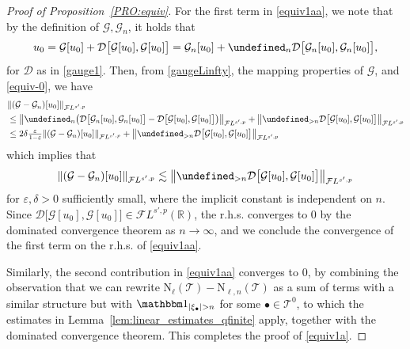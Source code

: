 \documentclass[a4paper,
11pt,  reqno]{amsart}
\newcommand{\5}{\textup{V}}
\newcommand{\FL}{\mathcal{F} L}
\newcommand{\ind}{\mathbbm 1}
\newcommand{\les}{\lesssim}
\newcommand{\dl}{\delta}
\newcommand{\eps}{\varepsilon}
\theoremstyle{remark}
\newcommand{\R}{\mathbb{R}}
\newcommand{\bul}{\bullet}
\let\P= \undefined
\newcommand{\P}{\mathbf{P}}
\newcommand{\TT}{\mathcal{T}}
\renewcommand{\l}{\ell}
\newcommand{\Gc}{\mathcal{G}}
\numberwithin{equation}{section}
\numberwithin{theorem}{section}
\newcommand{\NN}{\mathrm{N}}
\newcommand{\DD}{\mathcal{D}}
\begin{document}
\begin{proof}[Proof of Proposition~\ref{PRO:equiv}]
For the first term in \eqref{equiv1aa}, we note that by the definition of $\Gc, \Gc_n$, it holds that
\begin{align}
u_0
=
\Gc[u_0] + \DD\big[\Gc[u_0], \Gc[u_0]\big]
=
\Gc_n[u_0] + \P_n \DD\big[\Gc_n[u_0], \Gc_n[u_0]\big],
\end{align}
for $\DD$ as in \eqref{gauge1}. Then, from \eqref{gaugeLinfty}, the mapping properties of $\Gc$, and \eqref{equiv-0}, we have
\begin{align}
&
\| (\Gc - \Gc_n)[u_0] \|_{\FL^{s',p}}
\\
&
\le \big\| \P_n \big( \DD\big[\Gc_n[u_0], \Gc_n[u_0]\big]- \DD\big[\Gc[u_0], \Gc[u_0]\big]  \big)  \big\|_{\FL^{s',p}}
+
\big\| \P_{>n} \DD\big[\Gc[u_0], \Gc[u_0]\big]  \big\|_{\FL^{s',p}}
\\
&
\le 2  \dl \tfrac{\eps}{1-\eps} \| (\Gc - \Gc_n)[u_0] \|_{\FL^{s',p}} +
\big\| \P_{>n} \DD\big[\Gc[u_0], \Gc[u_0]\big]  \big\|_{\FL^{s',p}}
\end{align}
which implies that
\begin{align}
\| (\Gc - \Gc_n)[u_0] \|_{\FL^{s',p}}
\les \big\| \P_{>n} \DD\big[\Gc[u_0], \Gc[u_0]\big]  \big\|_{\FL^{s',p}}
\end{align}
for $\eps,\dl>0$ sufficiently small, where the implicit constant is independent on $n$. Since $\DD\big[\Gc[u_0], \Gc[u_0]\big] \in \FL^{s',p}(\R)$, the r.h.s. converges to 0 by the dominated convergence theorem as $n\to\infty$, and we conclude the convergence of the first term on the r.h.s. of \eqref{equiv1aa}.


Similarly, the second contribution in \eqref{equiv1aa} converges to 0, by combining the observation that we can rewrite $\NN_{\l}(\TT) - \NN_{\l, n}(\TT)$ as a sum of terms with a similar structure but with $\ind_{|\xi_{\bul}| > n}$ for some $\bul \in \TT^0$, to which the estimates in Lemma~\ref{lem:linear_estimates_qfinite} apply, together with the dominated convergence theorem.
This completes the proof of \eqref{equiv1a}.

\smallskip


\end{proof}
\end{document}

